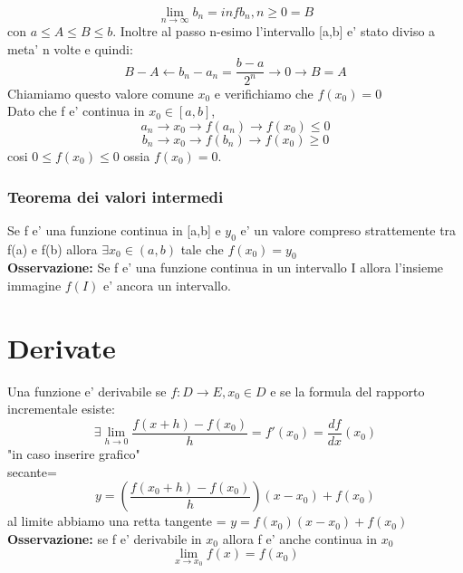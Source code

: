 \documentclass{article}
\begin{document}
\begin{flushleft}
\begin{flushleft}
\begin{equation}
                    \lim_{n\to \infty} b_n=inf{b_n,n\geq 0}=B
                \end{equation}
                con $a\leq A \leq B \leq b$. Inoltre al passo n-esimo l'intervallo [a,b] e'
                stato diviso a meta' n volte e quindi:
                \begin{equation}
                    B-A \leftarrow b_n-a_n=\frac{b-a}{2^n} \to 0 \to B=A
                \end{equation}
                Chiamiamo questo valore comune $x_0$ e verifichiamo che $f(x_0)=0$\\
                Dato che f e' continua in $x_0 \in [a,b]$,
                \begin{equation}
                    a_n \to x_0 \to f(a_n) \to f(x_0) \leq 0
                \end{equation}
                \begin{equation}
                    b_n \to x_0 \to f(b_n) \to f(x_0) \geq 0
                \end{equation}
                cosi $0\leq f(x_0)\leq 0$ ossia $f(x_0)=0$.
            \end{flushleft}
            \subsubsection{Teorema dei valori intermedi}
            \begin{flushleft}
                Se f e' una funzione continua in [a,b] e $y_0$ e' un valore compreso
                strattemente tra f(a) e f(b) allora $\exists x_0 \in (a,b)$ tale che $f(x_0)=y_0$\\
                \textbf{Osservazione:} Se f e' una funzione continua in un intervallo I allora l'insieme
                immagine $f(I)$ e' ancora un intervallo.
            \end{flushleft}
        \end{flushleft}
        \section{Derivate}
        \begin{flushleft}
         Una funzione e' derivabile se $f: D \to E,x_0 \in D$ e se la formula del rapporto incrementale esiste:
          \begin{equation}
            \exists \lim_{h \to 0} \frac{f(x+h)-f(x_0)}{h} = f'(x_0)=\frac{df}{dx}(x_0) 
          \end{equation}
          "in caso inserire grafico" \\ 
          secante=
          \begin{equation}
            y=(\frac{f(x_0+h)-f(x_0)}{h})(x-x_0)+f(x_0)
          \end{equation}
          al limite abbiamo una retta tangente = $y=f(x_0)(x-x_0)+f(x_0)$
          \textbf{Osservazione:} se f e' derivabile in $x_0$ allora f e' anche continua in $x_0$
          \begin{equation}
           \lim_{x \to x_0} f(x)=f(x_0) 
          \end{equation}
        \end{flushleft}
\end{document}
